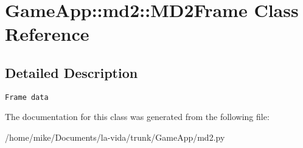\hypertarget{classGameApp_1_1md2_1_1MD2Frame}{
\section{GameApp::md2::MD2Frame Class Reference}
\label{classGameApp_1_1md2_1_1MD2Frame}
}


\subsection{Detailed Description}


\footnotesize\begin{verbatim}Frame data \end{verbatim}
\normalsize
 

The documentation for this class was generated from the following file:\begin{CompactItemize}
\item 
/home/mike/Documents/la-vida/trunk/GameApp/md2.py\end{CompactItemize}
